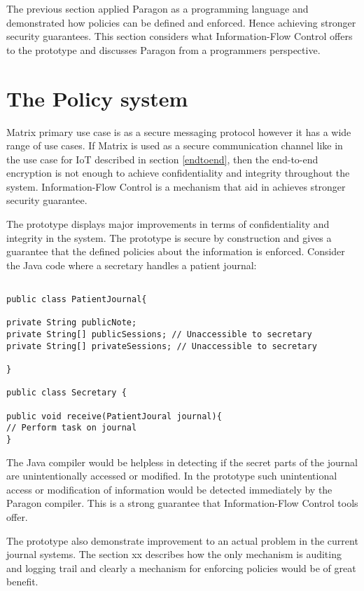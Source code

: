 The previous section applied Paragon as a programming language and demonstrated how policies can be defined and enforced. Hence achieving stronger security guarantees. This section considers what Information-Flow Control offers to the prototype and discusses Paragon from a programmers perspective.

\section{The Policy system}
Matrix primary use case is as a secure messaging protocol however it has a wide range of use cases. If Matrix is used as a secure communication channel like in the use case for IoT described in section \ref{endtoend}, then the end-to-end encryption is not enough to achieve confidentiality and integrity throughout the system. Information-Flow Control is a mechanism that aid in achieves stronger security guarantee.


The prototype displays major improvements in terms of confidentiality and integrity in the system. The prototype is secure by construction and gives a guarantee that the defined policies about the information is enforced. Consider the Java code where a secretary handles a patient journal: 

\begin{lstlisting}

public class PatientJournal{

private String publicNote;
private String[] publicSessions; // Unaccessible to secretary
private String[] privateSessions; // Unaccessible to secretary

}

public class Secretary {

public void receive(PatientJoural journal){
// Perform task on journal
}

\end{lstlisting}

The Java compiler would be helpless in detecting if the secret parts of the journal are unintentionally accessed or modified. In the prototype such unintentional access or modification of information would be detected immediately by the Paragon compiler. This is a strong guarantee that Information-Flow Control tools offer.

The prototype also demonstrate improvement to an actual problem in the current journal systems. The section xx describes how the only mechanism is auditing and logging trail and clearly a mechanism for enforcing policies would be of great benefit. 

